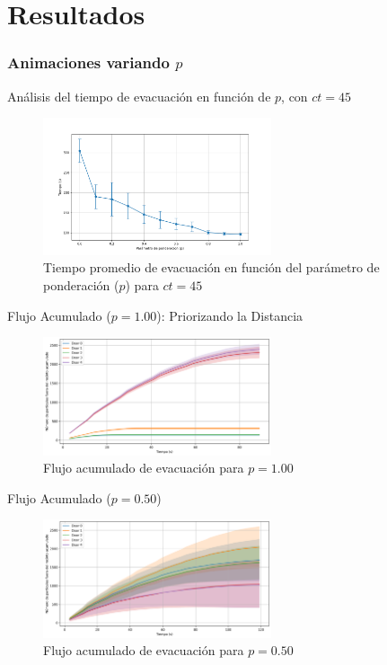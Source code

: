 \documentclass[aspectratio=169]{beamer}
\begin{document}
\section{Resultados}

\begin{frame}
    \frametitle{Animaciones variando $p$}
\end{frame}

\begin{frame}{Análisis del tiempo de evacuación en función de $p$, con $ct=45$}
    \begin{figure}
        \centering
        \includegraphics[width=0.60\textwidth]{img/evacuation_times_t_45.png}
        \caption{Tiempo promedio de evacuación en función del parámetro de ponderación ($p$) para $ct=45$}
    \end{figure}
\end{frame}

\begin{frame}{Flujo Acumulado ($p=1.00$): Priorizando la Distancia}
    \begin{figure}
        \centering
        \includegraphics[width=0.6\textwidth]{img/cumulative_door_flows_t_20_&_p_1.00.png}
        \caption{Flujo acumulado de evacuación para $p=1.00$}
    \end{figure}
\end{frame}

\begin{frame}{Flujo Acumulado ($p=0.50$)}
    \begin{figure}
        \centering
        \includegraphics[width=0.6\textwidth]{img/cumulative_door_flows_t_20_&_p_0.50.png}
        \caption{Flujo acumulado de evacuación para $p=0.50$}
    \end{figure}
\end{frame}
\end{document}
